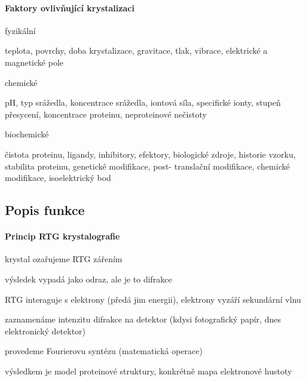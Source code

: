 \documentclass[DIV=8]{scrreprt}
\begin{document}
\paragraph{Faktory ovlivňující krystalizaci}
\begin{myItemize}[nosep]
    \item fyzikální
\begin{myItemize}[nosep]
    \item teplota, povrchy, doba krystalizace, gravitace, tlak, vibrace, elektrické a magnetické pole
\end{myItemize}

    \item chemické
\begin{myItemize}[nosep]
    \item pH, typ srážedla, koncentrace srážedla, iontová síla, specifické ionty, stupeň přesycení, koncentrace proteinu, neproteinové nečistoty
\end{myItemize}

    \item biochemické
\begin{myItemize}[nosep]
    \item čistota proteinu, ligandy, inhibitory, efektory, biologické zdroje, historie vzorku, stabilita proteinu, genetické modifikace, post- translační modifikace, chemické modifikace, isoelektrický bod
\end{myItemize}

\end{myItemize}



\subsection{Popis funkce} \label{Popis funkce}


\paragraph{Princip RTG krystalografie}
\begin{myEnumerate}[nosep]
    \item krystal ozařujeme RTG zářením
    \item výsledek vypadá jako odraz, ale je to difrakce
\begin{myItemize}[nosep]
    \item RTG interaguje s elektrony (předá jim energii), elektrony vyzáří sekundární vlnu
\end{myItemize}

    \item zaznamenáme intenzitu difrakce na detektor (kdysi fotografický papír, dnes elektronický detektor)
    \item provedeme Fourierovu syntézu (matematická operace)
    \item výsledkem je model proteinové struktury, konkrétně mapa elektronové hustoty
\end{myEnumerate}
\end{document}
